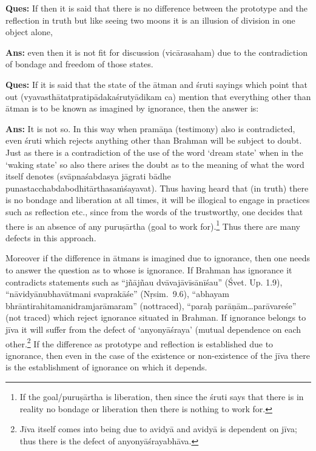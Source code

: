 \textbf{Ques:} If then it is said that there is no difference between the prototype and the reflection in truth but like seeing two moons it is an illusion of division in one object alone, 

\textbf{Ans:} even then it is not fit for discussion (vicārasaham) due to the contradiction of bondage and freedom of those states.

\textbf{Ques:} If it is said that the state of the ātman and śruti sayings which point that out (vyavasthātatpratipādakaśrutyādikam ca) mention that everything other than ātman is to be known as imagined by ignorance, then the answer is:

\textbf{Ans:} It is not so. In this way when pramāṇa (testimony) also is contradicted, even śruti which rejects anything other than Brahman will be subject to doubt. Just as there is a contradiction of the use of the word ‘dream state’ when in the ‘waking state’ so also there arises the doubt as to  the meaning of what the word itself denotes (svāpnaśabdasya jāgrati bādhe punastacchabdabodhitārthasaṁśayavat). Thus having heard that (in truth) there is no bondage and liberation at all times, it will be illogical to engage in practices such as reflection etc., since from the words of the trustworthy, one decides that there is an absence of any puruṣārtha (goal to work for).\footnote{If the goal/puruṣārtha is liberation, then since the śruti says that there is in reality no bondage or liberation then there is nothing to work for.} Thus there are many defects in this approach.

Moreover if the difference in ātmans is imagined due to ignorance, then one needs to answer the question as to whose is ignorance. If Brahman has ignorance it contradicts statements such as “jñājñau dvāvajāvīsānīśau” (Śvet. Up. 1.9), “nāvidyānubhavātmani svaprakāśe” (Nṛsim.~9.6), “abhayam bhrāntirahitamanidramjarāmaram” (not\break traced), “paraḥ parāṇām…parāvareśe” (not traced) which reject ignorance situated in Brahman. If ignorance belongs to jīva it will suffer from the defect of ‘anyonyāśraya’ (mutual dependence on each other.\footnote{Jīva itself comes into being due to avidyā and avidyā is dependent on jīva; thus there is the defect of anyonyāśrayabhāva.} If the difference as prototype and reflection is established due to ignorance, then even in the case of the existence or non-existence of the jīva there is the establishment of ignorance on which it depends. 

